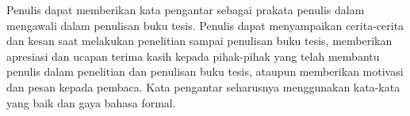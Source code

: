 
Penulis dapat memberikan kata pengantar sebagai prakata penulis dalam mengawali
dalam penulisan buku tesis. Penulis dapat menyampaikan cerita-cerita dan kesan
saat melakukan penelitian sampai penulisan buku tesis, memberikan apresiasi dan
ucapan terima kasih kepada pihak-pihak yang telah membantu penulis dalam
penelitian dan penulisan buku tesis, ataupun memberikan motivasi dan pesan
kepada pembaca. Kata pengantar seharusnya menggunakan kata-kata yang baik dan
gaya bahasa formal.
